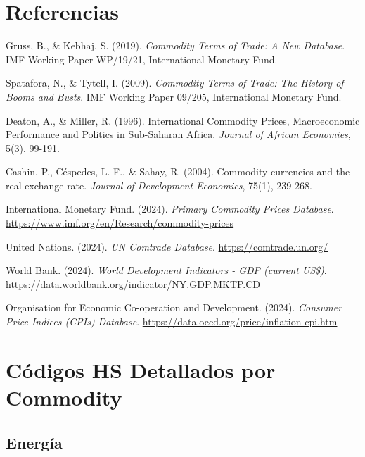 \documentclass[12pt,a4paper]{article}
\begin{document}
\newpage
\section*{Referencias}

\begin{thebibliography}{9}

Gruss, B., \& Kebhaj, S. (2019). 
\textit{Commodity Terms of Trade: A New Database}. 
IMF Working Paper WP/19/21, International Monetary Fund.

Spatafora, N., \& Tytell, I. (2009). 
\textit{Commodity Terms of Trade: The History of Booms and Busts}. 
IMF Working Paper 09/205, International Monetary Fund.

Deaton, A., \& Miller, R. (1996). 
International Commodity Prices, Macroeconomic Performance and Politics in Sub-Saharan Africa. 
\textit{Journal of African Economies}, 5(3), 99-191.

Cashin, P., Céspedes, L. F., \& Sahay, R. (2004). 
Commodity currencies and the real exchange rate. 
\textit{Journal of Development Economics}, 75(1), 239-268.

International Monetary Fund. (2024). 
\textit{Primary Commodity Prices Database}. 
\url{https://www.imf.org/en/Research/commodity-prices}

United Nations. (2024). 
\textit{UN Comtrade Database}. 
\url{https://comtrade.un.org/}

World Bank. (2024). 
\textit{World Development Indicators - GDP (current US\$)}. 
\url{https://data.worldbank.org/indicator/NY.GDP.MKTP.CD}

Organisation for Economic Co-operation and Development. (2024). 
\textit{Consumer Price Indices (CPIs) Database}. 
\url{https://data.oecd.org/price/inflation-cpi.htm}

\end{thebibliography}

\newpage
\appendix

\section{Códigos HS Detallados por Commodity}

\subsection{Energía}
\end{document}

